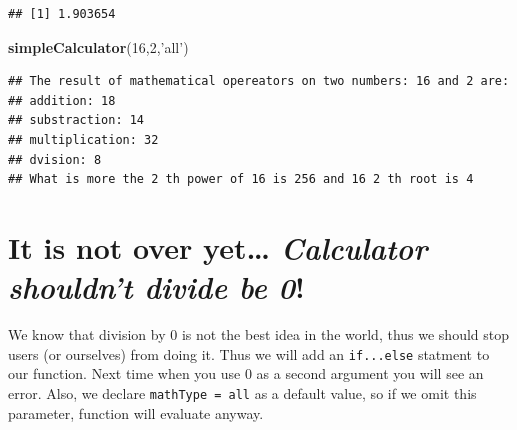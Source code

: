 \documentclass[]{book}
\newenvironment{Shaded}{\begin{snugshade}}{\end{snugshade}}
\newcommand{\KeywordTok}[1]{\textcolor[rgb]{0.12,0.11,0.11}{\textbf{#1}}}
\newcommand{\DecValTok}[1]{\textcolor[rgb]{0.69,0.50,0.00}{#1}}
\newcommand{\StringTok}[1]{\textcolor[rgb]{0.75,0.01,0.01}{#1}}
\newcommand{\NormalTok}[1]{\textcolor[rgb]{0.12,0.11,0.11}{#1}}
\theoremstyle{definition}
\theoremstyle{definition}
\theoremstyle{definition}
\theoremstyle{remark}
\begin{document}
\begin{verbatim}
## [1] 1.903654
\end{verbatim}

\begin{Shaded}
\begin{Highlighting}[]
\KeywordTok{simpleCalculator}\NormalTok{(}\DecValTok{16}\NormalTok{,}\DecValTok{2}\NormalTok{,}\StringTok{'all'}\NormalTok{)}
\end{Highlighting}
\end{Shaded}

\begin{verbatim}
## The result of mathematical opereators on two numbers: 16 and 2 are: 
## addition: 18 
## substraction: 14 
## multiplication: 32 
## dvision: 8 
## What is more the 2 th power of 16 is 256 and 16 2 th root is 4
\end{verbatim}

\section{\texorpdfstring{It is not over yet\ldots{} \emph{Calculator
shouldn't divide be
0}!}{It is not over yet\ldots{} Calculator shouldn't divide be 0!}}\label{it-is-not-over-yet-calculator-shouldnt-divide-be-0}

We know that division by 0 is not the best idea in the world, thus we
should stop users (or ourselves) from doing it. Thus we will add an
\texttt{if...else} statment to our function. Next time when you use 0 as
a second argument you will see an error. Also, we declare
\texttt{mathType\ =\ \textquotesingle{}all\textquotesingle{}} as a
default value, so if we omit this parameter, function will evaluate
anyway.
\end{document}
